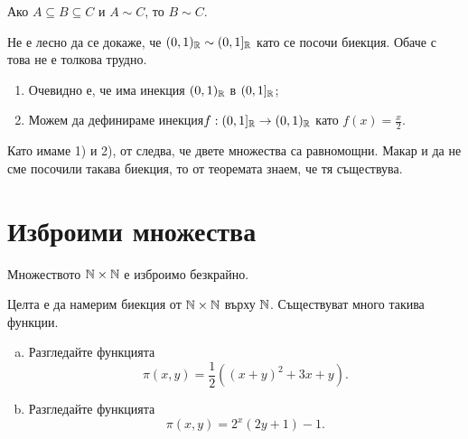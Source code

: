\begin{cor}
  Ако $A \subseteq B \subseteq C$ и $A \sim C$, то $B \sim C$.
\end{cor}

\begin{example}
  Не е лесно да се докаже, че $(0,1)_{\mathbb{R}} \sim (0,1]_{\mathbb{R}}$ като се посочи биекция.
  Обаче с  това не е толкова трудно.
  \begin{enumerate}[1)]
  \item 
    Очевидно е, че има инекция $(0,1)_{\mathbb{R}}$ в $(0,1]_{\mathbb{R}}$;
  \item
    Можем да дефинираме инекция$f:(0,1]_{\mathbb{R}} \to (0,1)_{\mathbb{R}}$
    като $f(x) = \frac{x}{2}$.    
  \end{enumerate}
  Като имаме 1) и 2), от  следва, че двете множества са равномощни.
  Макар и да не сме посочили такава биекция, то от теоремата знаем, че тя съществува.  
\end{example}


\section{Изброими множества}

\begin{prop}
  Множеството $\mathbb{N}\times\mathbb{N}$ е изброимо безкрайно.
\end{prop}
\begin{hint}
  Целта е да намерим биекция от $\mathbb{N}\times \mathbb{N}$ върху $\mathbb{N}$.
  Съществуват много такива функции.
  \begin{enumerate}[a)]
  \item 
    Разгледайте функцията 
    \[\pi(x,y) = \frac{1}{2}((x+y)^2+3x+y).\]
  \item
    Разгледайте функцията
    \[\pi(x,y) = 2^x(2y+1)-1.\]
  \end{enumerate}
\end{hint}

